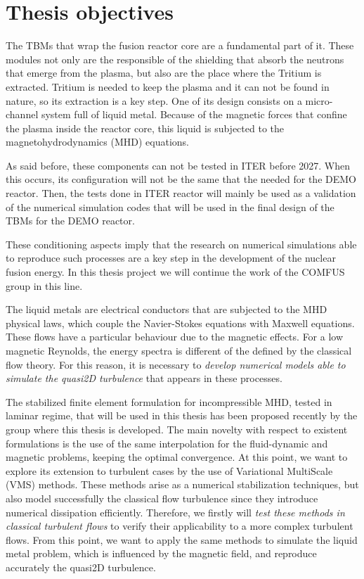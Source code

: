 \section{Thesis objectives}

The TBMs that wrap the fusion reactor core are a fundamental part of it. These modules not only are the responsible of the shielding that absorb the neutrons that emerge from the plasma, but also are the place where the Tritium is extracted. Tritium is needed to keep the plasma and it can not be found in nature, so its extraction is a key step. One of its design consists on a micro-channel system full of  liquid metal. Because of the magnetic forces that confine the plasma inside the reactor core, this liquid is subjected to the magnetohydrodynamics (MHD) equations.

As said before, these components can not be tested in ITER before 2027. When this occurs, its configuration will not be the same that the needed for the DEMO reactor. Then, the tests done in ITER reactor will mainly be used as a validation of the numerical simulation codes that will be used in the final design of the TBMs for the DEMO reactor.

These conditioning aspects imply that the research on numerical simulations able to reproduce such processes are a key step in the development of the nuclear fusion energy. In this thesis project we will continue the work of the COMFUS group in this line.

The liquid metals are electrical conductors that are subjected to the MHD physical laws, which couple the Navier-Stokes equations with Maxwell equations. These flows have a particular behaviour due to the magnetic effects. For a low magnetic Reynolds, the energy spectra is different of the defined by the classical flow theory. For this reason, it is necessary to \emph{develop numerical models able to simulate the quasi2D turbulence} that appears in these processes.

The stabilized finite element formulation for incompressible MHD, tested in laminar regime, that will be used in this thesis has been proposed recently by the group where this thesis is developed. The main novelty with respect to existent formulations is the use of the same interpolation for the fluid-dynamic and magnetic problems, keeping the optimal convergence. At this point, we want to explore its extension to turbulent cases by the use of Variational MultiScale (VMS) methods. These methods arise as a numerical stabilization techniques, but also model successfully the classical flow turbulence since they introduce numerical dissipation efficiently. Therefore, we firstly will \emph{test these methods in classical turbulent flows} to verify their applicability to a more complex turbulent flows. From this point, we want to apply the same methods to simulate the liquid metal problem, which is influenced by the magnetic field, and reproduce accurately the quasi2D turbulence.

